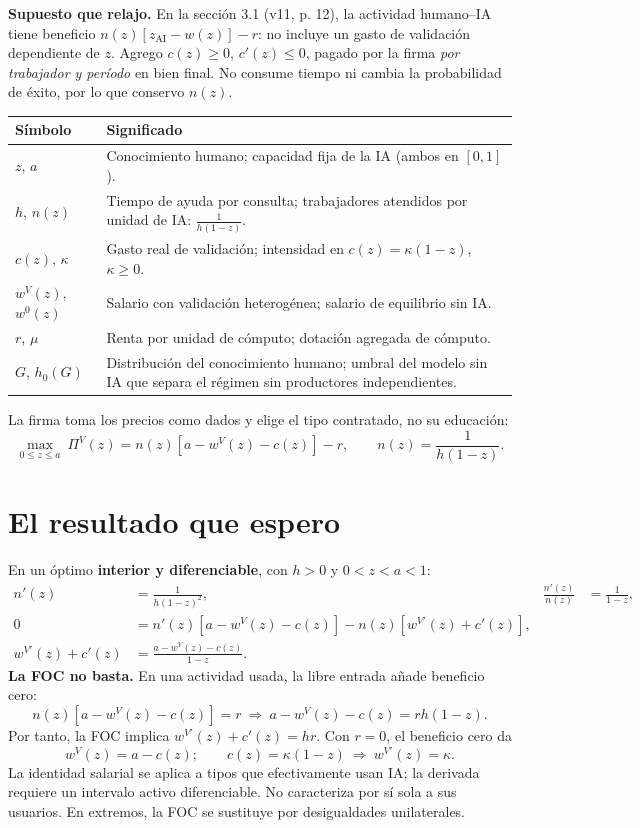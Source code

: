 \documentclass[11pt]{article}
\begin{document}
\textbf{Supuesto que relajo.} En la sección 3.1 (v11, p. 12), la actividad humano--IA tiene beneficio $n(z)[z_{\mathrm{AI}}-w(z)]-r$: no incluye un gasto de validación dependiente de $z$. Agrego $c(z)\geq0$, $c'(z)\leq0$, pagado por la firma \emph{por trabajador y período} en bien final. No consume tiempo ni cambia la probabilidad de éxito, por lo que conservo $n(z)$.
\begin{center}\small
\begin{tabular}{@{}p{.18\linewidth}p{.76\linewidth}@{}}\toprule
Símbolo & Significado \\\midrule
$z$, $a$ & Conocimiento humano; capacidad fija de la IA (ambos en $[0,1]$).\\
$h$, $n(z)$ & Tiempo de ayuda por consulta; trabajadores atendidos por unidad de IA: $\frac{1}{h(1-z)}$.\\
$c(z)$, $\kappa$ & Gasto real de validación; intensidad en $c(z)=\kappa(1-z)$, $\kappa\geq0$.\\
$w^V(z)$, $w^0(z)$ & Salario con validación heterogénea; salario de equilibrio sin IA.\\
$r$, $\mu$ & Renta por unidad de cómputo; dotación agregada de cómputo.\\
$G$, $h_0(G)$ & Distribución del conocimiento humano; umbral del modelo sin IA que separa el régimen sin productores independientes.\\\bottomrule
\end{tabular}
\end{center}
\newpage
La firma toma los precios como dados y elige el tipo contratado, no su educación:
\begin{equation}\label{eq:firm}
\max_{0\leq z\leq a}\ \Pi^V(z)=n(z)[a-w^V(z)-c(z)]-r,
\qquad n(z)=\frac1{h(1-z)}.
\end{equation}
\section{El resultado que espero}
En un óptimo \textbf{interior y diferenciable}, con $h>0$ y $0<z<a<1$:
\begin{align}
n'(z)&=\frac1{h(1-z)^2},&\frac{n'(z)}{n(z)}&=\frac1{1-z},\label{eq:ratio}\\
0&=n'(z)[a-w^V(z)-c(z)]-n(z)[w^{V\prime}(z)+c'(z)],\label{eq:foc}\\
w^{V\prime}(z)+c'(z)&=\frac{a-w^V(z)-c(z)}{1-z}.\label{eq:slope}
\end{align}
\textbf{La FOC no basta.} En una actividad usada, la libre entrada añade beneficio cero:
\begin{equation}
 n(z)[a-w^V(z)-c(z)]=r
 \ \Longrightarrow\ a-w^V(z)-c(z)=rh(1-z).
\end{equation}
Por tanto, la FOC implica $w^{V\prime}(z)+c'(z)=hr$. Con $r=0$, el beneficio cero da
\begin{equation}\label{eq:wage}
\boxed{w^V(z)=a-c(z)};\qquad c(z)=\kappa(1-z)\ \Longrightarrow\
\boxed{w^{V\prime}(z)=\kappa}.
\end{equation}
La identidad salarial se aplica a tipos que efectivamente usan IA; la derivada requiere un intervalo activo diferenciable. No caracteriza por sí sola a sus usuarios. En extremos, la FOC se sustituye por desigualdades unilaterales.
\end{document}
